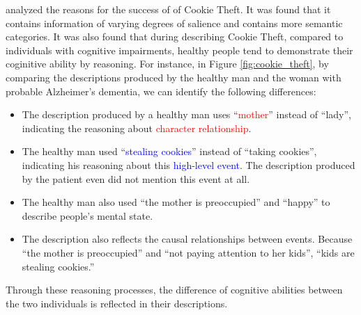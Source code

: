 \citet{describe-ctp} analyzed the reasons for the success of of Cookie Theft.
It was found that it contains information of varying degrees of salience and contains more semantic categories.
It was also found that during describing Cookie Theft, compared to individuals with cognitive impairments, healthy people tend to demonstrate their coginitive ability by reasoning.
For instance, in Figure \ref{fig:cookie_theft}, by comparing the descriptions produced by the healthy man and the woman with probable Alzheimer's dementia, we can identify the following differences:
\begin{itemize}
	\item The description produced by a healthy man uses ``\textcolor{red}{mother}'' instead of ``lady'', indicating the reasoning about \textcolor{red}{character relationship}. 
	\item The healthy man used ``\textcolor{blue}{stealing cookies}'' instead of ``taking cookies'', indicating his reasoning about this \textcolor{blue}{high-level event}. 
    The description produced by the patient even did not mention this event at all. 
    \item The healthy man also used ``the mother is \textcolor{c2}{preoccupied}'' and ``\textcolor{c2}{happy}'' to describe people's \textcolor{c2}{mental state}. 
    \item The description also reflects the  \textcolor{c1}{causal relationships between events}.
    Because ``\textcolor{c1}{the mother is preoccupied}'' and ``\textcolor{c1}{not paying attention to her kids}'', ``\textcolor{c1}{kids are stealing cookies.}''
\end{itemize}
Through these reasoning processes, the difference of cognitive abilities between the two individuals is reflected in their descriptions. 

